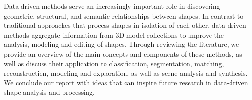 Data-driven methods serve an increasingly important role in discovering geometric, structural, and semantic relationships between shapes. 
In contrast to traditional approaches that process shapes in isolation of each other, data-driven methods aggregate information from 3D model collections to improve the analysis, modeling and editing of shapes.
Through reviewing the literature, we provide an overview of the main concepts and components of these methods, as well as discuss their application to classification, segmentation, matching, reconstruction, modeling and exploration, as well as scene analysis and synthesis.  
We conclude our report with ideas that can inspire future research in data-driven shape analysis and processing. 